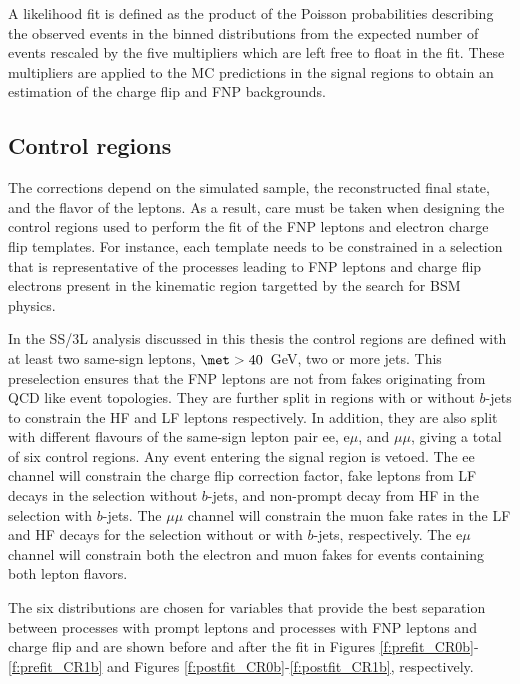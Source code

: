 A likelihood fit is defined as the product of the Poisson probabilities describing the observed events in the binned 
distributions from the expected number of events rescaled by the five multipliers which are left free to float in the fit.  
These multipliers are applied to the MC predictions in the signal regions to obtain an estimation of the charge flip and FNP backgrounds.

\subsection{Control regions}

The corrections depend on the simulated sample,
the reconstructed final state, and the flavor of the leptons. As a result, care must be taken when designing the control regions 
used to perform the fit of the FNP leptons and electron charge flip templates. 
For instance, each template needs to be constrained in a selection that is representative of the processes leading to 
FNP leptons and charge flip electrons present in the kinematic region targetted by the search for BSM physics. 

In the SS/3L analysis discussed in this thesis the control regions are defined with at least two same-sign 
leptons, $\met>40$~GeV, two or more jets. This preselection ensures that the FNP leptons are not from fakes originating from 
QCD like event topologies. 
They are further split in regions 
with or without $b$-jets to constrain the HF and LF leptons respectively. In addition, they are also split with different 
flavours of the same-sign lepton pair ee, e$\mu$, and $\mu\mu$, giving a total of six control regions. 
Any event entering the signal region is vetoed. The ee channel will constrain the charge flip correction factor, fake leptons 
 from LF decays in the selection without $b$-jets, and non-prompt decay from HF in the selection with $b$-jets. 
The $\mu\mu$ channel will constrain the muon fake rates in the LF and HF decays for the selection without or with $b$-jets, 
respectively. The e$\mu$ channel will constrain both the electron and muon fakes for events containing both lepton flavors. 

The six distributions are chosen for variables that provide the best separation between processes with prompt leptons and processes with FNP leptons and charge flip and are shown 
before and after the fit in Figures \ref{f:prefit_CR0b}-\ref{f:prefit_CR1b} and Figures \ref{f:postfit_CR0b}-\ref{f:postfit_CR1b}, respectively. 

